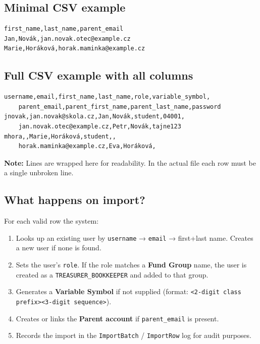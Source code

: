 \documentclass[a4paper,11pt]{article}
\begin{document}
\subsection{Minimal CSV example}

\begin{verbatim}
first_name,last_name,parent_email
Jan,Novák,jan.novak.otec@example.cz
Marie,Horáková,horak.maminka@example.cz
\end{verbatim}

\subsection{Full CSV example with all columns}

\begin{verbatim}
username,email,first_name,last_name,role,variable_symbol,
    parent_email,parent_first_name,parent_last_name,password
jnovak,jan.novak@skola.cz,Jan,Novák,student,04001,
    jan.novak.otec@example.cz,Petr,Novák,tajne123
mhora,,Marie,Horáková,student,,
    horak.maminka@example.cz,Eva,Horáková,
\end{verbatim}

\noindent
\textcolor{warnred}{\textbf{Note:}} Lines are wrapped here for readability.
In the actual file each row must be a single unbroken line.

\subsection{What happens on import?}

For each valid row the system:
\begin{enumerate}[noitemsep]
    \item Looks up an existing user by \texttt{username} → \texttt{email}
          → first+last name. Creates a new user if none is found.
    \item Sets the user's \texttt{role}. If the role matches a \textbf{Fund Group}
          name, the user is created as a \texttt{TREASURER\_BOOKKEEPER} and added
          to that group.
    \item Generates a \textbf{Variable Symbol} if not supplied
          (format: \texttt{<2-digit class prefix><3-digit sequence>}).
    \item Creates or links the \textbf{Parent account} if \texttt{parent\_email}
          is present.
    \item Records the import in the \texttt{ImportBatch} / \texttt{ImportRow} log
          for audit purposes.
\end{enumerate}
\end{document}
